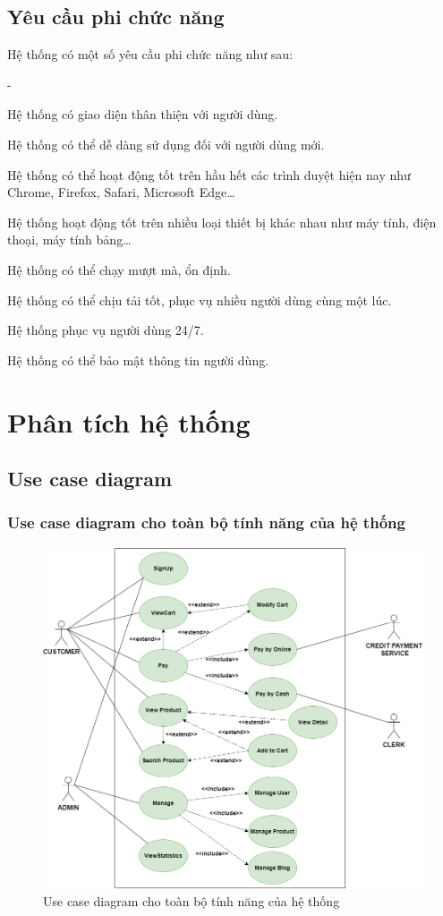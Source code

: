\subsection{Yêu cầu phi chức năng}
Hệ thống có một số yêu cầu phi chức năng như sau:
\begin {list} {-}{}
    \item Hệ thống có giao diện thân thiện với người dùng.
    \item Hệ thống có thể dễ dàng sử dụng đối với người dùng mới.
    \item Hệ thống có thể hoạt động tốt trên hầu hết các trình duyệt hiện nay như Chrome, Firefox, Safari, Microsoft Edge\dots
    \item Hệ thống hoạt động tốt trên nhiều loại thiết bị khác nhau như máy tính, điện thoại, máy tính bảng\dots
    \item Hệ thống có thể chạy mượt mà, ổn định.
    \item Hệ thống có thể chịu tải tốt, phục vụ nhiều người dùng cùng một lúc.
    \item Hệ thống phục vụ người dùng 24/7.
    \item Hệ thống có thể bảo mật thông tin người dùng.
\newpage
\section{Phân tích hệ thống}
\subsection{Use case diagram}
\subsubsection{Use case diagram cho toàn bộ tính năng của hệ thống}
\begin{figure}[h]
    \centering
    \includegraphics[scale=0.45]{images/hieu/chap-3/usecase-diagram.png}
    \caption{Use case diagram cho toàn bộ tính năng của hệ thống}
\end{figure}
\newpage

\end{list}
